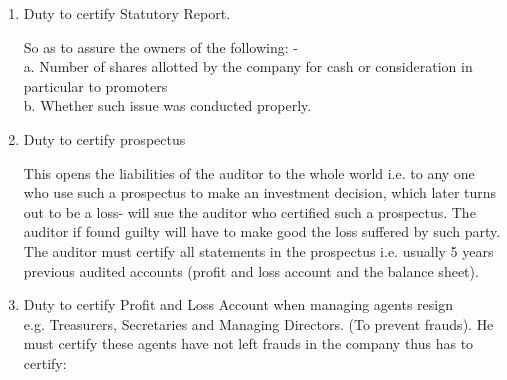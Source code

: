 \documentclass[10pt]{article}
\begin{document}
\begin{enumerate}
  Current audit file is that file containing information of a current nature. Such is only needed for that particular financial year 's audit and is thereafter closed. It will contain present balance sheet, profit and loss account, questionnaires, schedule of debtors and creditors, etc.\\
  Permanent audit file is that file which contains information of permanent nature, important to the auditor as regards the client's audit. It will contain - memorandum of\\
  association, articles of association, engagement letters, company's accounting policies, company's long-term investments, it is kept for 15 years after the auditor is no longer the company's auditor.\\
  \item Duty to certify Statutory Report.
  
  So as to assure the owners of the following: -\\
  a. Number of shares allotted by the company for cash or consideration in particular to promoters\\
  b. Whether such issue was conducted properly.\\
  \item Duty to certify prospectus
  
  This opens the liabilities of the auditor to the whole world i.e. to any one who use such a prospectus to make an investment decision, which later turns out to be a loss- will sue the auditor who certified such a prospectus. The auditor if found guilty will have to make good the loss suffered by such party. The auditor must certify all statements in the prospectus i.e. usually 5 years previous audited accounts (profit and loss account and the balance sheet).\\
  \item Duty to certify Profit and Loss Account when managing agents resign\\
  e.g. Treasurers, Secretaries and Managing Directors. (To prevent frauds). He must certify these agents have not left frauds in the company thus has to certify:
  

\end{enumerate}
\end{document}
